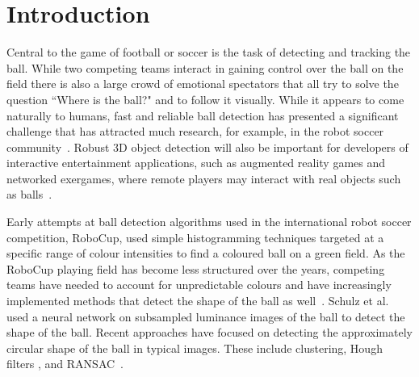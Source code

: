 \documentclass{sig-alternate-05-2015}
\newcommand{\citep}[1]{\cite{#1}}
\newcommand{\citet}[1]{\cite{#1}}
\begin{document}




	\section{Introduction} {
	\label{sec:intro}
Central to the game of football or soccer is the task of detecting and tracking the ball. While two competing teams interact in gaining control over the ball on the field there is also a large crowd of emotional spectators that all try to solve the question ``Where is the ball?" and to follow it visually. While it appears to come naturally to humans, fast and reliable ball detection has presented a significant challenge that has attracted much research, for example, in the robot soccer community~\cite{KitanoEtAl1997}. Robust 3D object detection will also be important for developers of interactive entertainment applications, such as augmented reality games and networked exergames, where remote players may interact with real objects such as balls~\citep{MuellerEtAl2011}.





		Early attempts at ball detection algorithms used in the international robot soccer competition, RoboCup, used simple histogramming techniques targeted at a specific range of colour intensities to find a coloured ball on a green field. As the RoboCup playing field has become less structured over the years, competing teams have needed to account for unpredictable colours and have increasingly implemented methods that detect the shape of the ball as well~\citep{MurchChalup2004}. Schulz et al.~\citet{schulz2007ball} used a neural network on subsampled luminance images of the ball to detect the shape of the ball. Recent approaches have focused on detecting the approximately circular shape of the ball in typical images. These include clustering, Hough filters \citep{li2013survey}, and RANSAC~\citep{annable2013nubots,FischlerBolles1981}.

}
\end{document}
